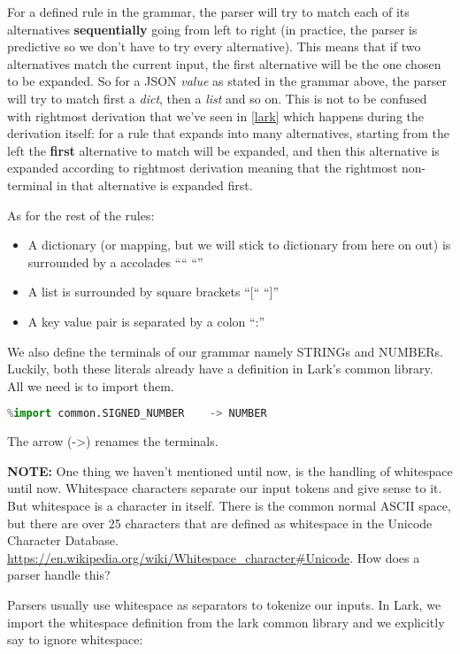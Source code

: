 \documentclass[12pt]{article}
\begin{document}
For a defined rule in the grammar, the parser will try to match each of its alternatives \textbf{sequentially} going from left to right (in practice, the parser is predictive so we don't have to try every alternative). This means that if two alternatives match the current input, the first alternative will be the one chosen to be expanded. So for a JSON \emph{value} as stated in the grammar above, the parser will try to match first a \emph{dict}, then a \emph{list} and so on. This is not to be confused with rightmost derivation that we've seen in \ref{lark} which happens during the derivation itself: for a rule that expands into many alternatives, starting from the left the \textbf{first} alternative to match will be expanded, and then this alternative is expanded according to rightmost derivation meaning that the rightmost non-terminal in that alternative is expanded first. 

As for the rest of the rules:
\begin{itemize}
    \item A dictionary (or mapping, but we will stick to dictionary from here on out) is surrounded by a accolades “{“ “}”
    \item A list is surrounded by square brackets “[“ “]”
    \item A key value pair is separated by a colon “:”
\end{itemize}

We also define the terminals of our grammar namely STRINGs and NUMBERs. Luckily, both these literals already have a definition in  Lark’s common library. All we need is to import them.

\begin{lstlisting}[language=Python]
%import common.ESCAPED_STRING   -> STRING
%import common.SIGNED_NUMBER    -> NUMBER
\end{lstlisting}

The arrow (->) renames the terminals. 

\textbf{NOTE:} One thing we haven’t mentioned until now, is the handling of whitespace until now. Whitespace characters separate our input tokens and give sense to it. But whitespace is a character in itself. There is the common normal ASCII space, but there are over 25 characters that are defined as whitespace in the Unicode Character Database. \url{https://en.wikipedia.org/wiki/Whitespace_character#Unicode}. How does a parser handle this? 

Parsers usually use whitespace as separators to tokenize our inputs. In Lark, we import the whitespace definition from the lark common library and we explicitly say to ignore whitespace:
\end{document}
